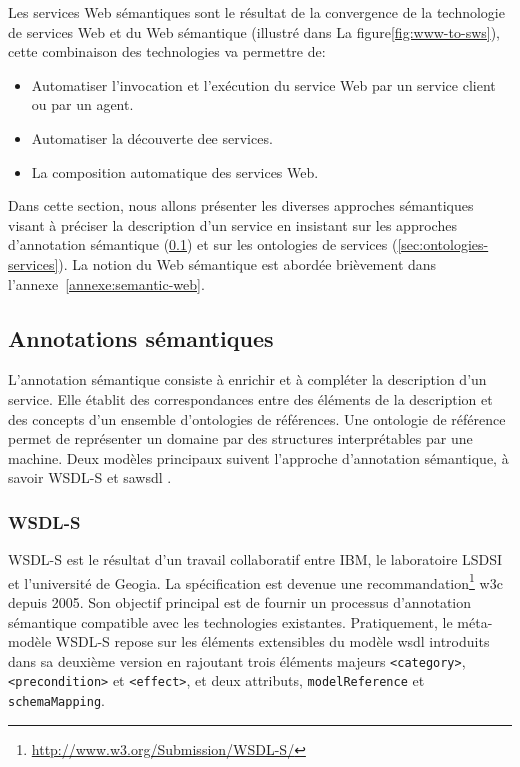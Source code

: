 

Les services Web sémantiques sont le résultat de la convergence de la
technologie de services Web et du Web sémantique (illustré dans La
figure\ref{fig:www-to-sws}), cette combinaison des technologies
va permettre de:

\begin{itemize}\renewcommand\labelitemi{--}
\item Automatiser l'invocation et l'exécution du service Web par un
  service client ou par un agent.

\item Automatiser la découverte dee services.

\item La composition automatique des services Web.
\end{itemize}
\enddescription

Dans cette section, nous allons présenter les diverses approches
sémantiques visant à préciser la description d'un service en insistant
sur les approches d'annotation sémantique
(\ref{sec:semantic-annotation}) et sur les ontologies de services
(\ref{sec:ontologies-services}). La notion du Web sémantique est
abordée brièvement dans l'annexe~\ref{annexe:semantic-web}.

  \subsection{Annotations sémantiques}
  \label{sec:semantic-annotation}
  L'annotation sémantique consiste à enrichir et à compléter la
  description d'un service. Elle établit des correspondances entre des
  éléments de la description et des concepts d'un ensemble
  d'ontologies de références. Une ontologie de référence permet de
  représenter un domaine par des structures interprétables par une
  machine. Deux modèles principaux suivent l'approche d'annotation
  sémantique, à savoir \textsc{WSDL-S} et \acrshort{sawsdl}
  \cite{elie2010}.

    \subsubsection{WSDL-S}
    \textsc{WSDL-S} \cite{akkiraju2005web} est le résultat d'un
    travail collaboratif entre IBM, le laboratoire LSDSI et
    l'université de Geogia. La spécification est devenue une
    recommandation\footnote{\url{http://www.w3.org/Submission/WSDL-S/}}
    \acrshort{w3c} depuis 2005. Son objectif principal est de fournir
    un processus d'annotation sémantique compatible avec les
    technologies existantes. Pratiquement, le méta-modèle
    \textsc{WSDL-S} repose sur les éléments extensibles du modèle
    \acrshort{wsdl} introduits dans sa deuxième version en rajoutant
    trois éléments majeurs \texttt{<category>},
    \texttt{<precondition>} et \texttt{<effect>}, et deux attributs,
    \texttt{modelReference} et \texttt{schemaMapping}.\medskip

